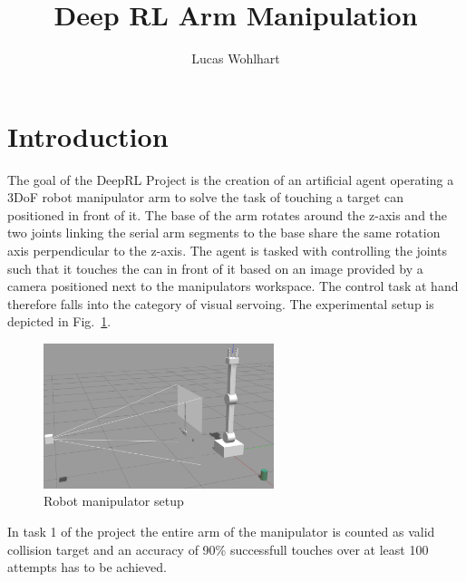 \documentclass[10pt,journal,compsoc]{IEEEtran}
\begin{document}
\title{Deep RL Arm Manipulation}

\author{Lucas Wohlhart}

%
{}

\maketitle

\section{Introduction}
The goal of the DeepRL Project is the creation of an artificial agent operating a 3DoF robot manipulator arm to solve the task of touching a target can positioned in front of it. The base of the arm rotates around the z-axis and the two joints linking the serial arm segments to the base share the same rotation axis perpendicular to the z-axis.
The agent is tasked with controlling the joints such that it touches the can in front of it based on an image provided by a camera positioned next to the manipulators workspace. The control task at hand therefore falls into the category of visual servoing. The experimental setup is depicted in Fig.~\ref{fig:deep_rl_arm}.

\begin{figure}[htbp]
    \begin{center}
      \includegraphics[width=0.6\textwidth]{img/deep_rl_arm}
    \end{center}
    \caption{Robot manipulator setup}
    \label{fig:deep_rl_arm}
\end{figure}
In task 1 of the project the entire arm of the manipulator is counted as valid collision target and an accuracy of 90\% successfull touches over at least 100 attempts has to be achieved.
\end{document}
